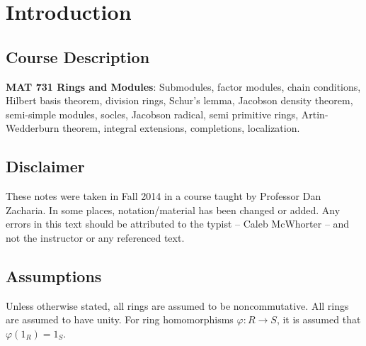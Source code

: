 \newpage
\section{Introduction}


\subsection{Course Description}

\textbf{MAT 731 Rings and Modules}: Submodules, factor modules, chain conditions, Hilbert basis theorem, division rings, Schur's lemma, Jacobson density theorem, semi-simple modules, socles, Jacobson radical, semi primitive rings, Artin-Wedderburn theorem, integral extensions, completions, localization.

\subsection{Disclaimer}

These notes were taken in Fall 2014 in a course taught by Professor Dan Zacharia. In some places, notation/material has been changed or added. Any errors in this text should be attributed to the typist -- Caleb McWhorter -- and not the instructor or any referenced text. 

\subsection{Assumptions}

Unless otherwise stated, all rings are assumed to be noncommutative. All rings are assumed to have unity. For ring homomorphisms $\varphi: R \rightarrow S$, it is assumed that $\varphi(1_R)=1_S$.































